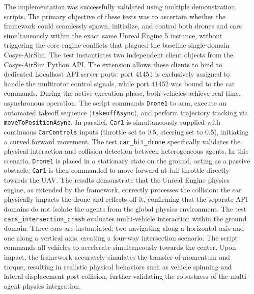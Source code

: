 The implementation was successfully validated using multiple demonstration scripts.
The primary objective of these tests was to ascertain whether the framework could seamlessly spawn, initialize, and control both drones and cars simultaneously within the exact same Unreal Engine 5 instance, without triggering the core engine conflicts that plagued the baseline single-domain Cosys-AirSim.\newline\newline
The test \texttt{} instantiates two independent client objects from the Cosys-AirSim Python API. The extension allows these clients to bind to dedicated Localhost API server ports: port 41451 is exclusively assigned to handle the multirotor control signals, while port 41452 was bound to the car commands.\newline
During the active execution phase, both vehicles achieve real-time, asynchronous operation. The script commands \texttt{Drone1} to arm, execute an automated takeoff sequence (\texttt{takeoffAsync}), and perform trajectory tracking via \texttt{moveToPositionAsync}. In parallel, \texttt{Car1} is simultaneously supplied with continuous \texttt{CarControls} inputs (throttle set to 0.5, steering set to 0.5), initiating a curved forward movement. \newline\newline
The test \texttt{car\_hit\_drone} specifically validates the physical interaction and collision detection between heterogeneous agents. In this scenario, \texttt{Drone1} is placed in a stationary state on the ground, acting as a passive obstacle. \texttt{Car1} is then commanded to move forward at full throttle directly towards the UAV. The results demonstrate that the Unreal Engine physics engine, as extended by the framework, correctly processes the collision: the car physically impacts the drone and reflects off it, confirming that the separate API domains do not isolate the agents from the global physics environment.\newline\newline
The test \texttt{cars\_intersection\_crash} evaluates multi-vehicle interaction within the ground domain. Three cars are instantiated: two navigating along a horizontal axis and one along a vertical axis, creating a four-way intersection scenario. The script commands all vehicles to accelerate simultaneously towards the center. Upon impact, the framework accurately simulates the transfer of momentum and torque, resulting in realistic physical behaviors such as vehicle spinning and lateral displacement post-collision, further validating the robustness of the multi-agent physics integration.\newline\newline
